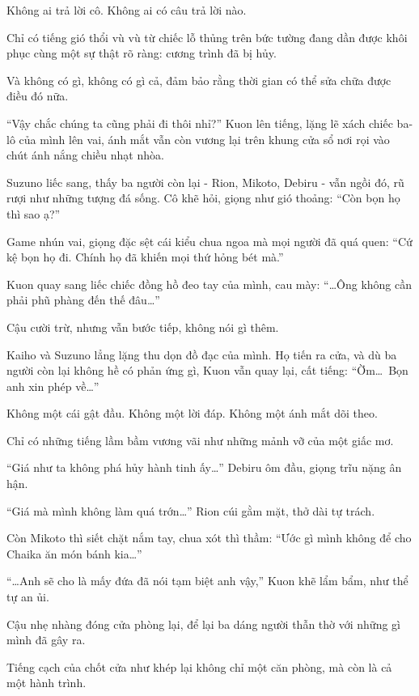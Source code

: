 \documentclass[../main.tex]{subfiles}
\begin{document}
Không ai trả lời cô. Không ai có câu trả lời nào.

Chỉ có tiếng gió thổi vù vù từ chiếc lỗ thủng trên bức tường đang dần được khôi phục cùng một sự thật rõ ràng: cương trình đã bị hủy.

Và không có gì, không có gì cả, đảm bảo rằng thời gian có thể sửa chữa được điều đó nữa.
\omk

``Vậy chắc chúng ta cũng phải đi thôi nhỉ?'' Kuon lên tiếng, lặng lẽ xách chiếc ba-lô của mình lên vai, ánh mắt vẫn còn vương lại trên khung cửa sổ nơi rọi vào chút ánh nắng chiều nhạt nhòa.

Suzuno liếc sang, thấy ba người còn lại - Rion, Mikoto, Debiru - vẫn ngồi đó, rũ rượi như những tượng đá sống. Cô khẽ hỏi, giọng như gió thoảng: ``Còn bọn họ thì sao ạ?''

Game nhún vai, giọng đặc sệt cái kiểu chua ngoa mà mọi người đã quá quen: ``Cứ kệ bọn họ đi. Chính họ đã khiến mọi thứ hỏng bét mà.''

Kuon quay sang liếc chiếc đồng hồ đeo tay của mình, cau mày: ``\dots Ông không cần phải phũ phàng đến thế đâu\dots''

Cậu cười trừ, nhưng vẫn bước tiếp, không nói gì thêm.

Kaiho và Suzuno lẳng lặng thu dọn đồ đạc của mình. Họ tiến ra cửa, và dù ba người còn lại không hề có phản ứng gì, Kuon vẫn quay lại, cất tiếng: ``Ờm\dots\ Bọn anh xin phép về\dots''

Không một cái gật đầu. Không một lời đáp. Không một ánh mắt dõi theo.

Chỉ có những tiếng lầm bầm vương vãi như những mảnh vỡ của một giấc mơ.

``Giá như ta không phá hủy hành tinh ấy\dots'' Debiru ôm đầu, giọng trĩu nặng ân hận.

``Giá mà mình không làm quá trớn\dots'' Rion cúi gằm mặt, thở dài tự trách.

Còn Mikoto thì siết chặt nắm tay, chua xót thì thầm: ``Ước gì mình không để cho Chaika ăn món bánh kia\dots''

``\dots Anh sẽ cho là mấy đứa đã nói tạm biệt anh vậy,'' Kuon khẽ lẩm bẩm, như thể tự an ủi.

Cậu nhẹ nhàng đóng cửa phòng lại, để lại ba dáng người thẫn thờ với những gì mình đã gây ra.

Tiếng cạch của chốt cửa như khép lại không chỉ một căn phòng, mà còn là cả một hành trình.
\end{document}
